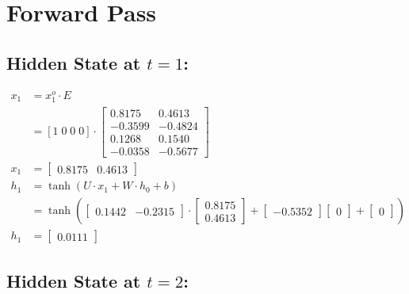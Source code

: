 \documentclass{article}
\begin{document}
\section{Forward Pass}
\subsection{Hidden State at \(t=1\):}

\begin{align*}
 x_1 & = x^o_1 \cdot E \\
    & =  [1 \; 0\; 0\; 0] \cdot \begin{bmatrix}
  0.8175 & 0.4613 \\
 -0.3599 & -0.4824 \\
  0.1268 & 0.1540 \\
 -0.0358 & -0.5677
\end{bmatrix} \\
    x_1 & = \begin{bmatrix}
  0.8175 & 0.4613 
\end{bmatrix}\\
h_1 &= \tanh(U \cdot x_1 + W \cdot h_0 + b) \\
&= \tanh\left(\begin{bmatrix}
0.1442 & -0.2315
\end{bmatrix} \cdot \begin{bmatrix}
  0.8175 \\ 0.4613 
\end{bmatrix} + \begin{bmatrix}
-0.5352
\end{bmatrix} \begin{bmatrix}
0
\end{bmatrix} + \begin{bmatrix}
0
\end{bmatrix}\right) \\
h_1 &= \begin{bmatrix}
0.0111
\end{bmatrix}
\end{align*}

\subsection{Hidden State at \(t=2\):}
\end{document}
